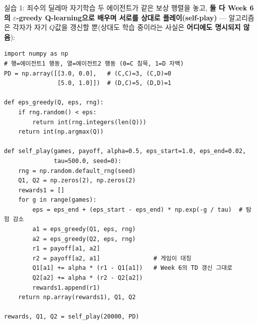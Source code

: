 \begin{frame}[fragile]{실습 1: 죄수의 딜레마 자기학습}
  두 에이전트가 같은 보상 행렬을 놓고, \textbf{둘 다 Week 6의
  $\varepsilon$-greedy Q-learning으로 배우며 서로를 상대로
  플레이(self-play)} --- 알고리즘은 각자가 자기 $Q$값을
  갱신할 뿐(상대도 학습 중이라는 사실은 \textbf{어디에도
  명시되지 않음}):
\begin{lstlisting}
import numpy as np
# 행=에이전트1 행동, 열=에이전트2 행동 (0=C 침묵, 1=D 자백)
PD = np.array([[3.0, 0.0],   # (C,C)=3, (C,D)=0
               [5.0, 1.0]])  # (D,C)=5, (D,D)=1

def eps_greedy(Q, eps, rng):
    if rng.random() < eps:
        return int(rng.integers(len(Q)))
    return int(np.argmax(Q))

def self_play(games, payoff, alpha=0.5, eps_start=1.0, eps_end=0.02,
              tau=500.0, seed=0):
    rng = np.random.default_rng(seed)
    Q1, Q2 = np.zeros(2), np.zeros(2)
    rewards1 = []
    for g in range(games):
        eps = eps_end + (eps_start - eps_end) * np.exp(-g / tau)  # 탐험 감소
        a1 = eps_greedy(Q1, eps, rng)
        a2 = eps_greedy(Q2, eps, rng)
        r1 = payoff[a1, a2]
        r2 = payoff[a2, a1]               # 게임이 대칭
        Q1[a1] += alpha * (r1 - Q1[a1])   # Week 6의 TD 갱신 그대로
        Q2[a2] += alpha * (r2 - Q2[a2])
        rewards1.append(r1)
    return np.array(rewards1), Q1, Q2

rewards, Q1, Q2 = self_play(20000, PD)
\end{lstlisting}
\end{frame}
